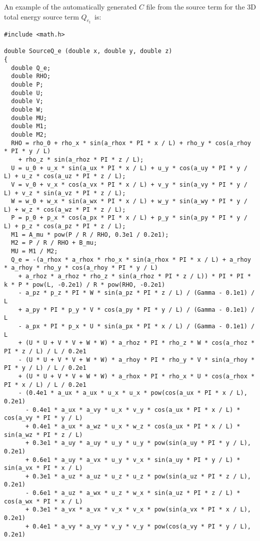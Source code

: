 \documentclass[10pt]{article}
\begin{document}
An example of the automatically generated $C$ file from the source term for the 3D total energy source term $Q_{e_t}$~is:

\begin{small}
\begin{verbatim}#include <math.h>

double SourceQ_e (double x, double y, double z)
{
  double Q_e;
  double RHO;
  double P;
  double U;
  double V;
  double W;
  double MU;
  double M1;
  double M2;
  RHO = rho_0 + rho_x * sin(a_rhox * PI * x / L) + rho_y * cos(a_rhoy * PI * y / L)
    + rho_z * sin(a_rhoz * PI * z / L);
  U = u_0 + u_x * sin(a_ux * PI * x / L) + u_y * cos(a_uy * PI * y / L) + u_z * cos(a_uz * PI * z / L);
  V = v_0 + v_x * cos(a_vx * PI * x / L) + v_y * sin(a_vy * PI * y / L) + v_z * sin(a_vz * PI * z / L);
  W = w_0 + w_x * sin(a_wx * PI * x / L) + w_y * sin(a_wy * PI * y / L) + w_z * cos(a_wz * PI * z / L);
  P = p_0 + p_x * cos(a_px * PI * x / L) + p_y * sin(a_py * PI * y / L) + p_z * cos(a_pz * PI * z / L);
  M1 = A_mu * pow(P / R / RHO, 0.3e1 / 0.2e1);
  M2 = P / R / RHO + B_mu;
  MU = M1 / M2;
  Q_e = -(a_rhox * a_rhox * rho_x * sin(a_rhox * PI * x / L) + a_rhoy * a_rhoy * rho_y * cos(a_rhoy * PI * y / L)
    + a_rhoz * a_rhoz * rho_z * sin(a_rhoz * PI * z / L)) * PI * PI * k * P * pow(L, -0.2e1) / R * pow(RHO, -0.2e1)
    - a_pz * p_z * PI * W * sin(a_pz * PI * z / L) / (Gamma - 0.1e1) / L
    + a_py * PI * p_y * V * cos(a_py * PI * y / L) / (Gamma - 0.1e1) / L
    - a_px * PI * p_x * U * sin(a_px * PI * x / L) / (Gamma - 0.1e1) / L
    + (U * U + V * V + W * W) * a_rhoz * PI * rho_z * W * cos(a_rhoz * PI * z / L) / L / 0.2e1
    - (U * U + V * V + W * W) * a_rhoy * PI * rho_y * V * sin(a_rhoy * PI * y / L) / L / 0.2e1
    + (U * U + V * V + W * W) * a_rhox * PI * rho_x * U * cos(a_rhox * PI * x / L) / L / 0.2e1
    - (0.4e1 * a_ux * a_ux * u_x * u_x * pow(cos(a_ux * PI * x / L), 0.2e1)
      - 0.4e1 * a_ux * a_vy * u_x * v_y * cos(a_ux * PI * x / L) * cos(a_vy * PI * y / L)
      + 0.4e1 * a_ux * a_wz * u_x * w_z * cos(a_ux * PI * x / L) * sin(a_wz * PI * z / L)
      + 0.3e1 * a_uy * a_uy * u_y * u_y * pow(sin(a_uy * PI * y / L), 0.2e1)
      + 0.6e1 * a_uy * a_vx * u_y * v_x * sin(a_uy * PI * y / L) * sin(a_vx * PI * x / L)
      + 0.3e1 * a_uz * a_uz * u_z * u_z * pow(sin(a_uz * PI * z / L), 0.2e1)
      - 0.6e1 * a_uz * a_wx * u_z * w_x * sin(a_uz * PI * z / L) * cos(a_wx * PI * x / L)
      + 0.3e1 * a_vx * a_vx * v_x * v_x * pow(sin(a_vx * PI * x / L), 0.2e1)
      + 0.4e1 * a_vy * a_vy * v_y * v_y * pow(cos(a_vy * PI * y / L), 0.2e1)

\end{verbatim}
\end{small}
\end{document}
